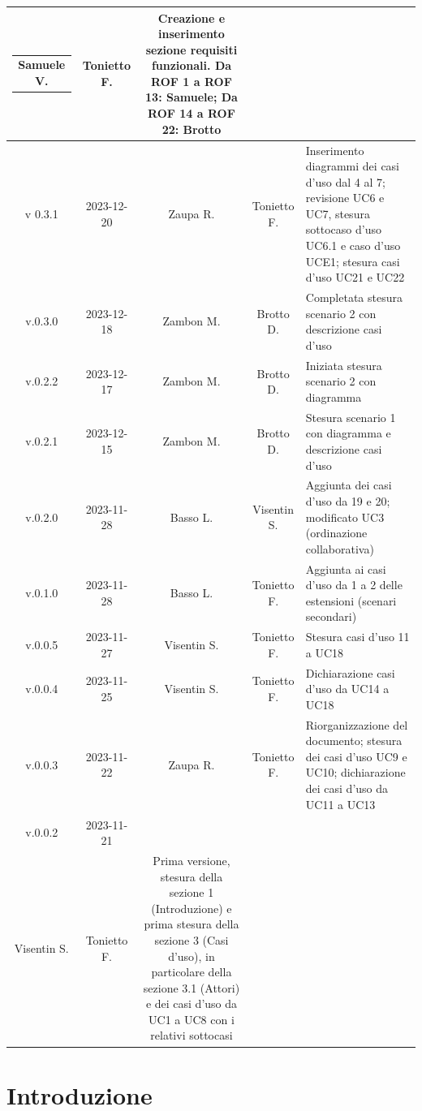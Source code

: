 \documentclass[12pt, oneside]{article}
\begin{document}
\begin{longtable}{|c|c|c|c|p{7cm}|}
\begin{tabular}[c]{@{}c@{}}
    Samuele V.
  \end{tabular} 
& Tonietto F. & Creazione e inserimento sezione requisiti funzionali. Da ROF 1 a ROF 13: Samuele; Da ROF 14 a ROF 22: Brotto\\
\hline
v 0.3.1 & 2023-12-20 & Zaupa R. & Tonietto F. & Inserimento diagrammi dei casi d'uso dal 4 al 7; revisione  UC6 e UC7, stesura sottocaso d'uso UC6.1 e caso d'uso UCE1; stesura casi d'uso UC21 e UC22 \\
\hline
v.0.3.0 & 2023-12-18 & Zambon M. & Brotto D. & Completata stesura scenario 2 con descrizione casi d'uso \\
\hline
v.0.2.2 & 2023-12-17 & Zambon M. & Brotto D. & Iniziata stesura scenario 2 con diagramma \\
\hline
v.0.2.1 & 2023-12-15 & Zambon M. & Brotto D. & Stesura scenario 1 con diagramma e descrizione casi d'uso \\
\hline
v.0.2.0 & 2023-11-28 & Basso L. & Visentin S. & Aggiunta dei casi d'uso da 19 e 20; modificato UC3 (ordinazione collaborativa) \\
\hline
v.0.1.0 & 2023-11-28 & Basso L. & Tonietto F. & Aggiunta ai casi d'uso da 1 a 2 delle estensioni (scenari secondari) \\
\hline
v.0.0.5 & 2023-11-27 & Visentin S. & Tonietto F. & Stesura casi d'uso 11 a UC18 \\
\hline
v.0.0.4 & 2023-11-25 & Visentin S. & Tonietto F. & Dichiarazione casi d'uso da UC14 a UC18 \\
\hline
v.0.0.3 & 2023-11-22 & Zaupa R. & Tonietto F. & Riorganizzazione del documento; stesura dei casi d'uso UC9 e UC10; dichiarazione dei casi d'uso da UC11 a UC13 \\
\hline
v.0.0.2 & 2023-11-21 & 
  \begin{tabular}[c]{@{}c@{}}
    Zaupa R. \\
    Visentin S.
  \end{tabular} 
  & Tonietto F. & Prima versione, stesura della sezione 1 (Introduzione) e prima stesura della sezione 3 (Casi d'uso), in particolare della sezione 3.1 (Attori) e dei casi d'uso da UC1 a UC8 con i relativi sottocasi\\
\hline
\end{longtable}
\newpage

\tableofcontents
\newpage

\section{Introduzione}
\end{document}
